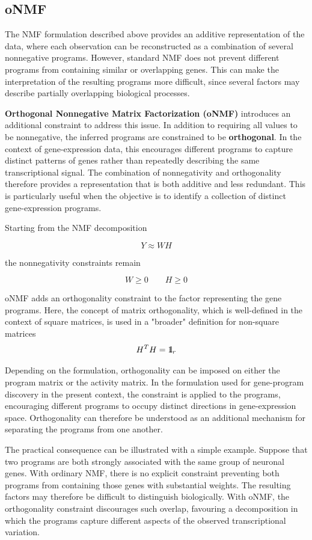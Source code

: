\documentclass[11pt,a4paper]{article}
\newcommand\identity{1\kern-0.25em\text{l}}
\begin{document}
\subsection{oNMF} 

The NMF formulation described above provides an additive representation of the data, where each observation can be reconstructed as a combination of several nonnegative programs. However, standard NMF does not prevent different programs from containing similar or overlapping genes. This can make the interpretation of the resulting programs more difficult, since several factors may describe partially overlapping biological processes.

\textbf{Orthogonal Nonnegative Matrix Factorization (oNMF)} introduces an additional constraint to address this issue. In addition to requiring all values to be nonnegative, the inferred programs are constrained to be \textbf{orthogonal}. In the context of gene-expression data, this encourages different programs to capture distinct patterns of genes rather than repeatedly describing the same transcriptional signal. The combination of nonnegativity and orthogonality therefore provides a representation that is both additive and less redundant. This is particularly useful when the objective is to identify a collection of distinct gene-expression programs.

Starting from the NMF decomposition

\[
Y \approx WH
\]

the nonnegativity constraints remain

\[
W\geq0
\qquad
H\geq0
\]

oNMF adds an orthogonality constraint to the factor representing the gene programs. Here, the concept of matrix orthogonality, which is well-defined in the context of square matrices, is used in a "broader" definition for non-square matrices
\[
H^T H = \identity_r
\]

Depending on the formulation, orthogonality can be imposed on either the program matrix or the activity matrix. In the formulation used for gene-program discovery in the present context, the constraint is applied to the programs, encouraging different programs to occupy distinct directions in gene-expression space. Orthogonality can therefore be understood as an additional mechanism for separating the programs from one another. 

The practical consequence can be illustrated with a simple example. Suppose that two programs are both strongly associated with the same group of neuronal genes. With ordinary NMF, there is no explicit constraint preventing both programs from containing those genes with substantial weights. The resulting factors may therefore be difficult to distinguish biologically. With oNMF, the orthogonality constraint discourages such overlap, favouring a decomposition in which the programs capture different aspects of the observed transcriptional variation.
\end{document}
